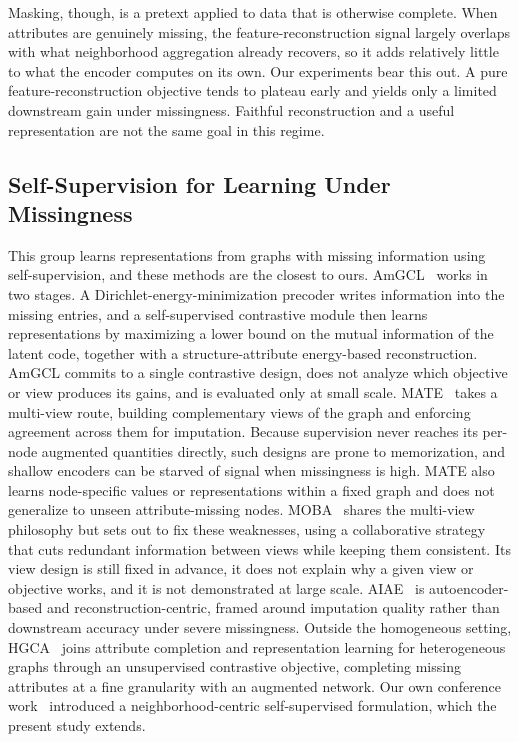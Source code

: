 Masking, though, is a pretext applied to data that is otherwise complete. When attributes are
genuinely missing, the feature-reconstruction signal largely overlaps with what neighborhood
aggregation already recovers, so it adds relatively little to what the encoder computes on its own. Our
experiments bear this out. A pure feature-reconstruction objective tends to plateau early and yields only a
limited downstream gain under missingness. Faithful reconstruction and a useful representation are
not the same goal in this regime.


\subsection{Self-Supervision for Learning Under Missingness}
\label{sec:related-missing}

This group learns representations from graphs with missing information using self-supervision, and these methods are the closest to ours.
AmGCL~\cite{zhang2023amgcl} works in two stages. A Dirichlet-energy-minimization precoder writes
information into the missing entries, and a self-supervised contrastive module then learns
representations by maximizing a lower bound on the mutual information of the latent code,
together with a structure-attribute energy-based reconstruction. AmGCL commits to a single
contrastive design, does not analyze which objective or view produces its gains, and is
evaluated only at small scale. MATE~\cite{peng2023mate} takes a multi-view route, building complementary
views of the graph and enforcing agreement across them for imputation. Because supervision
never reaches its per-node augmented quantities directly, such designs are prone to
memorization, and shallow encoders can be starved of signal when missingness is high. 
MATE also learns node-specific values or representations within a fixed graph and does not generalize to unseen attribute-missing nodes.
MOBA~\cite{yu2024moba}
shares the multi-view philosophy but sets out to fix these weaknesses, using a
collaborative strategy that cuts redundant information between views while keeping them
consistent. Its view design is still fixed in advance, it does not explain why a given view
or objective works, and it is not demonstrated at large scale. AIAE~\cite{xia2024aiae} is autoencoder-based
and reconstruction-centric, framed around imputation quality rather than downstream accuracy
under severe missingness. Outside the homogeneous setting, HGCA~\cite{he2022hgca} joins attribute
completion and representation learning for heterogeneous graphs through an unsupervised
contrastive objective, completing missing attributes at a fine granularity with an augmented
network. Our own conference work~\cite{moshiri2026neighborhood} introduced a neighborhood-centric self-supervised
formulation, which the present study extends.

